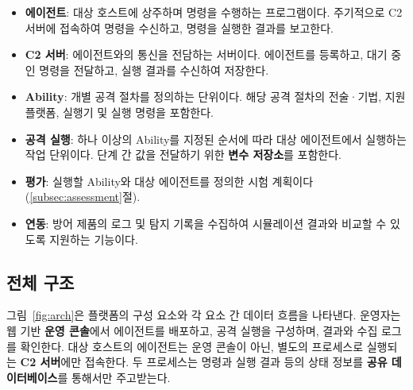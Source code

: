 \begin{itemize}
    \item \textbf{에이전트}: 대상 호스트에 상주하며 명령을 수행하는 프로그램이다. 주기적으로 C2 서버에 접속하여 명령을 수신하고, 명령을 실행한 결과를 보고한다.
    \item \textbf{C2 서버}: 에이전트와의 통신을 전담하는 서버이다. 에이전트를 등록하고, 대기 중인 명령을 전달하고, 실행 결과를 수신하여 저장한다.
    \item \textbf{Ability}: 개별 공격 절차를 정의하는 단위이다. 해당 공격 절차의 전술·기법, 지원 플랫폼, 실행기 및 실행 명령을 포함한다.
    \item \textbf{공격 실행}: 하나 이상의 Ability를 지정된 순서에 따라 대상 에이전트에서 실행하는 작업 단위이다. 단계 간 값을 전달하기 위한 \textbf{변수 저장소}를 포함한다.
    \item \textbf{평가}: 실행할 Ability와 대상 에이전트를 정의한 시험 계획이다(\ref{subsec:assessment}절).
    \item \textbf{연동}: 방어 제품의 로그 및 탐지 기록을 수집하여 시뮬레이션 결과와 비교할 수 있도록 지원하는 기능이다.
\end{itemize}

\subsection{전체 구조}\label{subsec:arch}

그림~\ref{fig:arch}은 플랫폼의 구성 요소와 각 요소 간 데이터 흐름을 나타낸다.
운영자는 웹 기반 \textbf{운영 콘솔}에서 에이전트를 배포하고, 공격 실행을 구성하며, 결과와 수집 로그를 확인한다.
대상 호스트의 에이전트는 운영 콘솔이 아닌, 별도의 프로세스로 실행되는 \textbf{C2 서버}에만 접속한다.
두 프로세스는 명령과 실행 결과 등의 상태 정보를 \textbf{공유 데이터베이스}를 통해서만 주고받는다.

